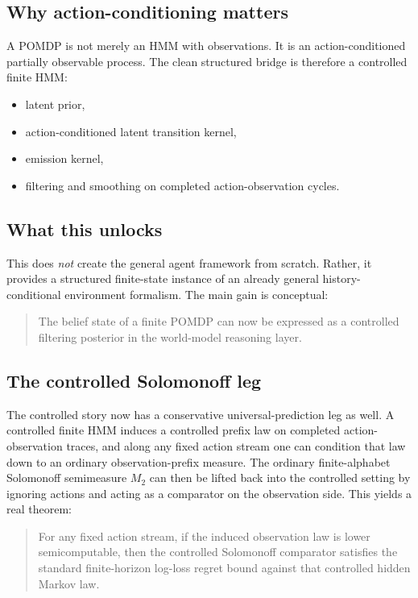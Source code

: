 \documentclass[11pt]{article}
\begin{document}
\subsection{Why action-conditioning matters}

A POMDP is not merely an HMM with observations.  It is an action-conditioned
partially observable process.  The clean structured bridge is therefore a
controlled finite HMM:
\begin{itemize}
  \item latent prior,
  \item action-conditioned latent transition kernel,
  \item emission kernel,
  \item filtering and smoothing on completed action-observation cycles.
\end{itemize}

\subsection{What this unlocks}

This does \emph{not} create the general agent framework from scratch.  Rather,
it provides a structured finite-state instance of an already general
history-conditional environment formalism.  The main gain is conceptual:
\begin{quote}
The belief state of a finite POMDP can now be expressed as a controlled
filtering posterior in the world-model reasoning layer.
\end{quote}

\subsection{The controlled Solomonoff leg}

The controlled story now has a conservative universal-prediction leg as well.
A controlled finite HMM induces a controlled prefix law on completed
action-observation traces, and along any fixed action stream one can condition
that law down to an ordinary observation-prefix measure.  The ordinary
finite-alphabet Solomonoff semimeasure $M_2$ can then be lifted back into the
controlled setting by ignoring actions and acting as a comparator on the
observation side.  This yields a real theorem:
\begin{quote}
For any fixed action stream, if the induced observation law is lower
semicomputable, then the controlled Solomonoff comparator satisfies the
standard finite-horizon log-loss regret bound against that controlled hidden
Markov law.
\end{quote}
\end{document}
